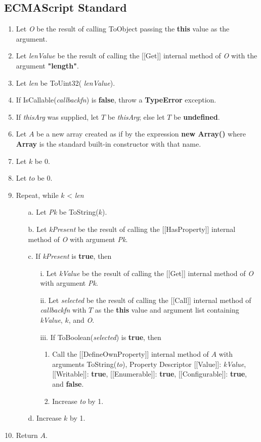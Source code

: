 \documentclass[a4paper,11pt,twoside]{report}
\begin{document}
\subsection{ECMAScript Standard}
\begin{enumerate}
\item Let \textit{O} be the result of calling ToObject passing the \textbf{this} value as the argument.
\item Let \textit{lenValue} be the result of calling the [[Get]] internal method of \textit{O} with the argument \textbf{"length"}.
\item Let \textit{len} be ToUint32( \textit{lenValue}).
\item If IsCallable(\textit{callbackfn}) is \textbf{false}, throw a \textbf{TypeError} exception.
\item If \textit{thisArg} was supplied, let $T$ be \textit{thisArg}; else let $T$ be \textbf{undefined}.
\item Let $A$ be a new array created as if by the expression \textbf{new Array()} where \textbf{Array} is the standard built-in constructor with that name.
\item Let $k$ be 0.
\item Let $to$ be 0.
\item Repeat, while $k$ < \textit{len}
\begin{enumerate}
\item[a.] Let \textit{Pk} be ToString($k$).
\item[b.] Let \textit{kPresent} be the result of calling the [[HasProperty]] internal method of \textit{O} with argument \textit{Pk}.
\item[c.] If \textit{kPresent} is \textbf{true}, then
\begin{enumerate}
\item[i.] Let \textit{kValue} be the result of calling the [[Get]] internal method of \textit{O} with argument \textit{Pk}.
\item[ii.] Let \textit{selected} be the result of calling the [[Call]] internal method of \textit{callbackfn} with $T$ as the \textbf{this} value and argument list containing \textit{kValue}, $k$, and \textit{O}.
\item[iii.] If ToBoolean(\textit{selected}) is \textbf{true}, then
\begin{enumerate}
\item Call the [[DefineOwnProperty]] internal method of $A$ with arguments ToString(\textit{to}), Property Descriptor {[[Value]]: \textit{kValue}, [[Writable]]: \textbf{true}, [[Enumerable]]: \textbf{true}, [[Configurable]]: \textbf{true}}, and \textbf{false}.
\item Increase \textit{to} by 1.
\end{enumerate}
\end{enumerate}
\item[d.] Increase $k$ by 1.
\end{enumerate}
\item Return $A$.
\end{enumerate}
\end{document}
